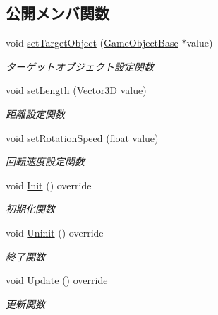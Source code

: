 \subsection*{公開メンバ関数}
\begin{DoxyCompactItemize}
\item 
void \mbox{\hyperlink{class_camera_state___homing_target_aa7b98f9c8be34abc365005910a572c26}{set\+Target\+Object}} (\mbox{\hyperlink{class_game_object_base}{Game\+Object\+Base}} $\ast$value)
\begin{DoxyCompactList}\small\item\em ターゲットオブジェクト設定関数 \end{DoxyCompactList}\item 
void \mbox{\hyperlink{class_camera_state___homing_target_a6a67d7a1b2da38e6429fc301ce4c1ee1}{set\+Length}} (\mbox{\hyperlink{class_vector3_d}{Vector3D}} value)
\begin{DoxyCompactList}\small\item\em 距離設定関数 \end{DoxyCompactList}\item 
void \mbox{\hyperlink{class_camera_state___homing_target_afde37b63ed7d0c8b029f6a0483909bc2}{set\+Rotation\+Speed}} (float value)
\begin{DoxyCompactList}\small\item\em 回転速度設定関数 \end{DoxyCompactList}\item 
void \mbox{\hyperlink{class_camera_state___homing_target_aaf95e93c2036a280bbc0a6a9a7df6b37}{Init}} () override
\begin{DoxyCompactList}\small\item\em 初期化関数 \end{DoxyCompactList}\item 
void \mbox{\hyperlink{class_camera_state___homing_target_ab2b5379b35ebafc53189bf4d45646c8c}{Uninit}} () override
\begin{DoxyCompactList}\small\item\em 終了関数 \end{DoxyCompactList}\item 
void \mbox{\hyperlink{class_camera_state___homing_target_a488be0a41b5c00fbfaa56db73aefd45c}{Update}} () override
\begin{DoxyCompactList}\small\item\em 更新関数 \end{DoxyCompactList}\end{DoxyCompactItemize}
